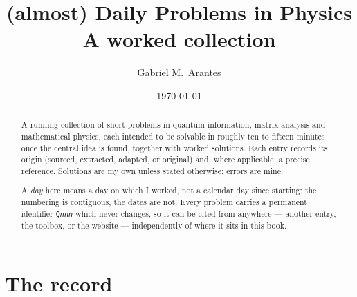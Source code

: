 \documentclass[11pt,a4paper,oneside,open=any,numbers=noenddot]{scrbook}
\title{(almost) Daily Problems in Physics\\[0.3em]
       \large A worked collection}
\author{Gabriel M.\ Arantes}
\date{\today}
\begin{document}
\frontmatter
\maketitle

\begin{abstract}
\noindent
A running collection of short problems in quantum information, matrix analysis and
mathematical physics, each intended to be solvable in roughly ten to fifteen minutes
once the central idea is found, together with worked solutions. Each entry records its
origin (sourced, extracted, adapted, or original) and, where applicable, a precise
reference. Solutions are my own unless stated otherwise; errors are mine.

\medskip\noindent
A \emph{day} here means a day on which I worked, not a calendar day since starting:
the numbering is contiguous, the dates are not. Every problem carries a permanent
identifier \texttt{Q\textit{nnn}} which never changes, so it can be cited from
anywhere --- another entry, the toolbox, or the website --- independently of where it
sits in this book.
\end{abstract}

\cleardoublepage
\tableofcontents

\cleardoublepage
\chapter*{The record}

\noindent
\wbcalendarauto

\mainmatter

















\end{document}
